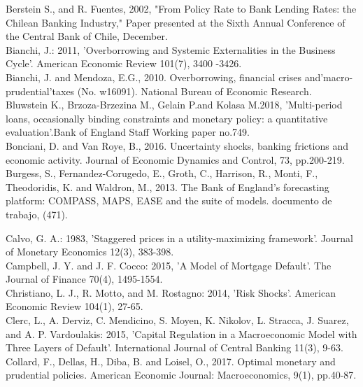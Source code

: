 \documentclass[12pt]{article}
\numberwithin{equation}{section}
\begin{document}
Berstein S., and R. Fuentes, 2002, "From Policy Rate to Bank Lending Rates: the Chilean Banking Industry," Paper presented at the Sixth Annual Conference of the Central Bank of Chile, December.\\

Bianchi, J.: 2011, 'Overborrowing and Systemic Externalities in the Business Cycle'.
American Economic Review 101(7), 3400 -3426.\\

Bianchi, J. and Mendoza, E.G., 2010. Overborrowing, financial crises and'macro-prudential'taxes (No. w16091). National Bureau of Economic Research. \\

Bluwstein K., Brzoza-Brzezina M., Gelain P.and Kolasa M.2018, 'Multi-period loans, occasionally binding constraints and monetary policy:
a quantitative evaluation'.Bank of England Staff Working paper no.749.\\

Bonciani, D. and Van Roye, B., 2016. Uncertainty shocks, banking frictions and economic activity. Journal of Economic Dynamics and Control, 73, pp.200-219. \\

Burgess, S., Fernandez-Corugedo, E., Groth, C., Harrison, R., Monti, F., Theodoridis, K. and Waldron, M., 2013. The Bank of England’s forecasting platform: COMPASS, MAPS, EASE and the suite of models. documento de trabajo, (471).

Calvo, G. A.: 1983, 'Staggered prices in a utility-maximizing framework'. Journal of Monetary Economics 12(3), 383-398.\\

Campbell, J. Y. and J. F. Cocco: 2015, 'A Model of Mortgage Default'. The Journal of Finance 70(4), 1495-1554.\\

Christiano, L. J., R. Motto, and M. Rostagno: 2014, 'Risk Shocks'. American
Economic Review 104(1), 27-65.\\

Clerc, L., A. Derviz, C. Mendicino, S. Moyen, K. Nikolov, L. Stracca, J. Suarez,
and A. P. Vardoulakis: 2015, 'Capital Regulation in a Macroeconomic Model with
Three Layers of Default'. International Journal of Central Banking 11(3), 9-63.\\

Collard, F., Dellas, H., Diba, B. and Loisel, O., 2017. Optimal monetary and prudential policies. American Economic Journal: Macroeconomics, 9(1), pp.40-87. \\
\end{document}
